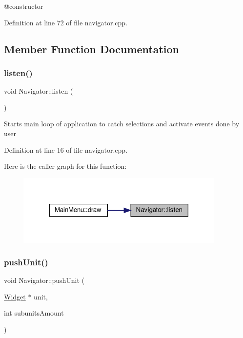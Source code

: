 @constructor 

Definition at line 72 of file navigator.\+cpp.



\subsection{Member Function Documentation}
\mbox{\label{class_navigator_ab9b30029b9ef06cca27ebc5b2549121c}} 
\subsubsection{\texorpdfstring{listen()}{listen()}}
{\footnotesize\ttfamily void Navigator\+::listen (\begin{DoxyParamCaption}{ }\end{DoxyParamCaption})}

Starts main loop of application to catch selections and activate events done by user 

Definition at line 16 of file navigator.\+cpp.

Here is the caller graph for this function\+:
\nopagebreak
\begin{figure}[H]
\begin{center}
\leavevmode
\includegraphics[width=293pt]{class_navigator_ab9b30029b9ef06cca27ebc5b2549121c_icgraph}
\end{center}
\end{figure}
\mbox{\label{class_navigator_a47967fc9bdfd276c98f8ed1c44d5dc46}} 
\subsubsection{\texorpdfstring{pushUnit()}{pushUnit()}}
{\footnotesize\ttfamily void Navigator\+::push\+Unit (\begin{DoxyParamCaption}\item[{\mbox{\hyperlink{class_widget}{Widget}} $\ast$}]{unit,  }\item[{int}]{subunits\+Amount }\end{DoxyParamCaption})}

